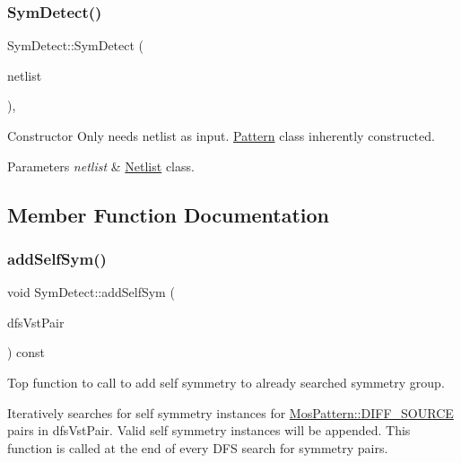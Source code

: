 \subsubsection{\texorpdfstring{Sym\+Detect()}{SymDetect()}}
{\footnotesize\ttfamily Sym\+Detect\+::\+Sym\+Detect (\begin{DoxyParamCaption}\item[{const \hyperlink{classNetlist}{Netlist} \&}]{netlist }\end{DoxyParamCaption})\hspace{0.3cm}{\ttfamily [inline]}, {\ttfamily [explicit]}}



Constructor Only needs netlist as input. \hyperlink{classPattern}{Pattern} class inherently constructed. 


\begin{DoxyParams}{Parameters}
{\em netlist} & \hyperlink{classNetlist}{Netlist} class. \\
\hline
\end{DoxyParams}


\subsection{Member Function Documentation}
\mbox{\label{classSymDetect_ac3075fde17fa6c33093a683b18f17086}} 
\subsubsection{\texorpdfstring{add\+Self\+Sym()}{addSelfSym()}}
{\footnotesize\ttfamily void Sym\+Detect\+::add\+Self\+Sym (\begin{DoxyParamCaption}\item[{std\+::vector$<$ \hyperlink{classMosPair}{Mos\+Pair} $>$ \&}]{dfs\+Vst\+Pair }\end{DoxyParamCaption}) const\hspace{0.3cm}{\ttfamily [private]}}



Top function to call to add self symmetry to already searched symmetry group. 

Iteratively searches for self symmetry instances for \hyperlink{type_8h_af19eddb079bfea723256710b029c38e8ad45b64a7d6b85dde1b52dd5a18863933}{Mos\+Pattern\+::\+D\+I\+F\+F\+\_\+\+S\+O\+U\+R\+CE} pairs in dfs\+Vst\+Pair. Valid self symmetry instances will be appended. This function is called at the end of every D\+FS search for symmetry pairs.


